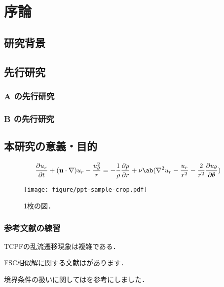 
\chapter{序論}
\label{ch:introduction}


\section{研究背景}
\label{sec:background}


\section{先行研究}
\label{sec:previous}

\subsection{A の先行研究}
\label{ssec:previous_A}

\subsection{B の先行研究}
\label{ssec:previous_B}


\section{本研究の意義・目的}
\label{sec:objective}

\begin{equation}
    \pdv{u_r}{t} + (\mathbf{u}\cdot\nabla)u_r - \frac{u_\theta^2}{r} = 
    -\frac{1}{\rho}\pdv{p}{r} + \nu\ab(\nabla^2 u_r - \frac{u_r}{r^2} - \frac{2}{r^2}\pdv{u_\theta}{\theta})
    \label{eq:NSr2}
\end{equation}

\begin{figure}[tp]
    \centering
    \texttt{[image: figure/ppt-sample-crop.pdf]}
    \caption{1枚の図．}
    \label{fig:one_figure}
\end{figure}

\subsection{参考文献の練習}
\label{ssec:bibtex}

\citet{Matsukawa:PoF2022}

TCPFの乱流遷移現象は複雑である\citep{Matsukawa:PoF2022}．

FSC相似解に関する文献は\citet{Liu:2021}があります．

境界条件の扱いに関しては\citet{Guastoni:2021}を参考にしました．
